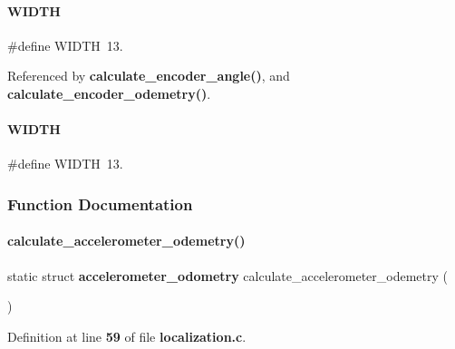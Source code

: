 \mbox{\label{localization_8c_a241aeeb764887ae5e3de58b98f04b16d}} 
\paragraph{W\+I\+D\+TH\hspace{0.1cm}{\footnotesize\ttfamily [1/2]}}
{\footnotesize\ttfamily \#define W\+I\+D\+TH~13.}



Referenced by \textbf{ calculate\+\_\+encoder\+\_\+angle()}, and \textbf{ calculate\+\_\+encoder\+\_\+odemetry()}.

\mbox{\label{localization_8c_a241aeeb764887ae5e3de58b98f04b16d}} 
\paragraph{W\+I\+D\+TH\hspace{0.1cm}{\footnotesize\ttfamily [2/2]}}
{\footnotesize\ttfamily \#define W\+I\+D\+TH~13.}



\subsubsection{Function Documentation}
\mbox{\label{localization_8c_a6785e4b3b61887f28028f05019b9b39d}} 
\paragraph{calculate\+\_\+accelerometer\+\_\+odemetry()}
{\footnotesize\ttfamily static struct \textbf{ accelerometer\+\_\+odometry} calculate\+\_\+accelerometer\+\_\+odemetry (\begin{DoxyParamCaption}{ }\end{DoxyParamCaption})\hspace{0.3cm}{\ttfamily [static]}}



Definition at line \textbf{ 59} of file \textbf{ localization.\+c}.



